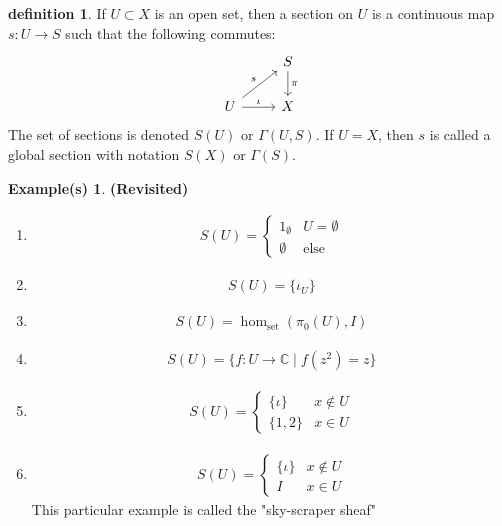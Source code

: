 \documentclass[10.5pt]{article}
\theoremstyle{definition}
\newtheorem{definition}{definition}
\newtheorem*{example}{Example(s)}
\newcommand{\set}[1]{\{#1\}}
\newcommand{\tor}{\text{ or }}
\begin{document}
    \begin{definition}
        If \(U \subset X\) is an open set, then a section on \(U\) is a continuous map \(s: U \to S\) such that the following commutes:
        \begin{equation*}
            \begin{tikzcd}
                &S \arrow[d,"{\pi}"] \\
                U \arrow[ru,"{s}"] \arrow[r,"{\iota}"] &X
            \end{tikzcd}
        \end{equation*}
        The set of sections is denoted \(S(U) \tor \Gamma(U,S)\). If \(U = X\), then \(s\) is called a global section with notation \(S(X)\) or \(\Gamma(S)\).
    \end{definition}

    \begin{example}\textbf{(Revisited)}
        \begin{enumerate}
            \item \begin{align*}
                S(U) = \begin{cases}
                    1_\emptyset & U = \emptyset \\
                    \emptyset & \text{else}
                \end{cases}
            \end{align*}
            \item \begin{align*}
                S(U) = \set{\iota_U}
            \end{align*}
            \item \begin{align*}
                S(U) = \hom_\text{set}(\pi_0(U),I)
            \end{align*}
            \item \begin{align*}
                S(U) = \set{f: U \to \mathbb{C} \mid f(z^2) = z}
            \end{align*}
            \item \begin{align*}
                S(U) = \begin{cases}
                    \set{\iota} & x \not \in U \\ \set{1,2} & x \in U
                \end{cases}
            \end{align*}
            \item \begin{align*}
                S(U) = \begin{cases}
                    \set{\iota} & x \not \in U \\ I & x \in U
                \end{cases}
            \end{align*}
            This particular example is called the "sky-scraper sheaf"
        \end{enumerate}
    \end{example}
\end{document}
